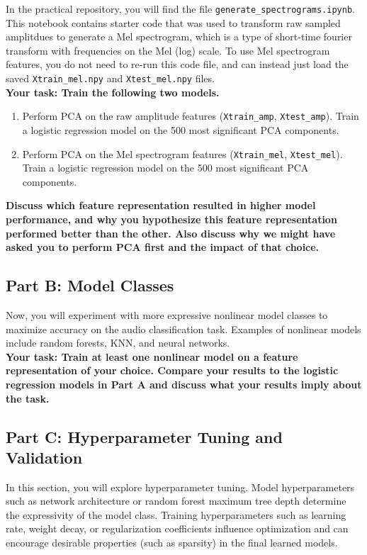 \documentclass[12pt]{article}
\begin{document}
\noindent In the practical repository, you will find the file \verb|generate_spectrograms.ipynb|. This notebook contains starter code that was used to transform raw sampled amplitdues to generate a Mel spectrogram, which is a type of short-time fourier transform with frequencies on the Mel (log) scale.  To use Mel spectrogram features, you do not need to re-run this code file, and can instead just load the saved \texttt{Xtrain\_mel.npy} and \texttt{Xtest\_mel.npy} files.\\
 
\noindent \textbf{Your task: Train the following two models.}
\begin{enumerate}
    \item Perform PCA on the raw amplitude features (\texttt{Xtrain\_amp}, \texttt{Xtest\_amp}).  Train a logistic regression model on the  500 most significant PCA components.   
    \item Perform PCA on the Mel spectrogram features (\texttt{Xtrain\_mel}, \texttt{Xtest\_mel}).  Train a logistic regression model on the 500 most significant PCA components.
\end{enumerate}
\textbf{Discuss which feature representation resulted in higher model performance, and why you hypothesize this feature representation performed better than the other.  Also discuss why we might have asked you to perform PCA first and the impact of that choice.}

\subsection{Part B: Model Classes}

Now, you will experiment with more expressive nonlinear model classes to maximize accuracy on the audio classification task.  Examples of nonlinear models include random forests, KNN, and neural networks.\\

\noindent \textbf{Your task: Train at least one nonlinear model on a feature representation of your choice.  Compare your results to the logistic regression models in Part A and discuss what your results imply about the task.}

\subsection{Part C: Hyperparameter Tuning and Validation}

In this section, you will explore hyperparameter tuning.  Model hyperparameters such as network architecture or random forest maximum tree depth determine the expressivity of the model class.  Training hyperparameters such as learning rate, weight decay, or regularization coefficients influence optimization and can encourage desirable properties (such as sparsity) in the final learned models.\\
\end{document}
